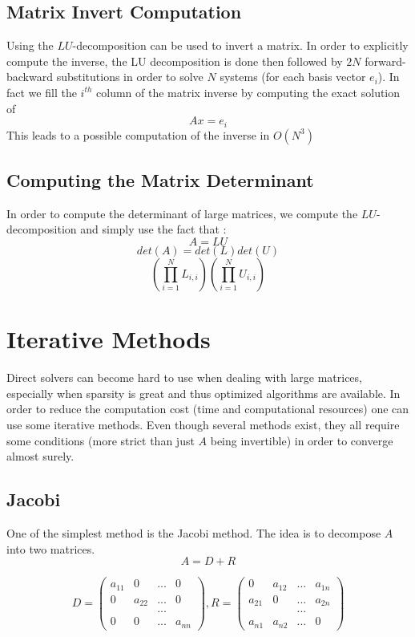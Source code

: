 \documentclass[a4paper]{report}
\begin{document}
\subsection{Matrix Invert Computation}
Using the $LU$-decomposition can be used to invert a matrix.
In order to explicitly compute the inverse, the LU decomposition is done then followed by $2N$ forward-backward substitutions in order to solve $N$ systems (for each basis vector $e_i$). In fact we fill the $i^{th}$ column of the matrix inverse by computing the exact solution of
\[
Ax=e_i
\]
This leads to a possible computation of the inverse in $O(N^3)$
\subsection{Computing the Matrix Determinant}
In order to compute the determinant of large matrices, we compute the $LU$-decomposition and simply use the fact that :
\[
A=LU
\]
\[
det(A)=det(L)det(U)
\]
\[
\left( \prod_{i=1}^N L_{i,i} \right) \left(\prod_{i=1}^N U_{i,i}  \right)
\]
\section{Iterative Methods}
Direct solvers can become hard to use when dealing with large matrices, especially when sparsity is great and thus optimized algorithms are available. In order to reduce the computation cost (time and computational resources) one can use some iterative methods. Even though several methods exist, they all require some conditions (more strict than just $A$ being invertible) in order to converge almost surely.
\subsection{Jacobi}
One of the simplest method is the Jacobi method. The idea is to decompose $A$ into two matrices.
\[
A=D+R
\]

\[
D=\left(\begin{matrix}
a_{11} & 0 & ...& 0\\
0&a_{22}&...&0\\
 & & ... &\\
 0&0&...&a_{nn}
\end{matrix} \right)
,
R=\left(\begin{matrix}
0 & a_{12} & ...& a_{1n}\\
a_{21}&0&...&a_{2n}\\
 & & ... &\\
a_{n1}&a_{n2}&...&0
\end{matrix} \right)
\]
\end{document}
